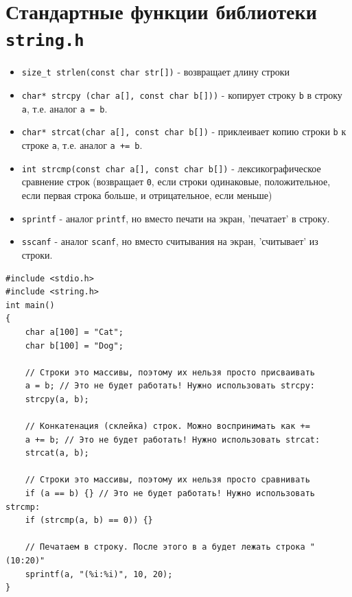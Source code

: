 \documentclass{article}
\begin{document}
\section*{Стандартные функции библиотеки \texttt{string.h}}
\begin{itemize}
\item \texttt{size\_t strlen(const char str[])} - возвращает длину строки
\item \texttt{char* strcpy (char a[], const char b[]))} - копирует строку \texttt{b} в строку \texttt{a}, т.е. аналог \texttt{a = b}.
\item \texttt{char* strcat(char a[], const char b[])} - приклеивает копию строки \texttt{b} к строке \texttt{a}, т.е. аналог \texttt{a += b}.
\item \texttt{int strcmp(const char a[], const char b[])} - лексикографическое сравнение строк (возвращает \texttt{0}, если строки одинаковые, положительное, если первая строка больше, и отрицательное, если меньше)
\item \texttt{sprintf} - аналог \texttt{printf}, но вместо печати на экран, 'печатает' в строку.
\item \texttt{sscanf} - аналог \texttt{scanf}, но вместо считывания на экран, 'считывает' из строки.
\end{itemize}
\begin{lstlisting}
#include <stdio.h>
#include <string.h>
int main() 
{
    char a[100] = "Cat";
    char b[100] = "Dog";
	
    // Строки это массивы, поэтому их нельзя просто присваивать 
    a = b; // Это не будет работать! Нужно использовать strcpy:
    strcpy(a, b);
    
    // Конкатенация (склейка) строк. Можно воспринимать как +=
    a += b; // Это не будет работать! Нужно использовать strcat:
    strcat(a, b);
	
    // Строки это массивы, поэтому их нельзя просто сравнивать
    if (a == b) {} // Это не будет работать! Нужно использовать strcmp:
    if (strcmp(a, b) == 0)) {} 
    
    // Печатаем в строку. После этого в a будет лежать строка "(10:20)"
    sprintf(a, "(%i:%i)", 10, 20);
}
\end{lstlisting}


\newpage
\end{document}
